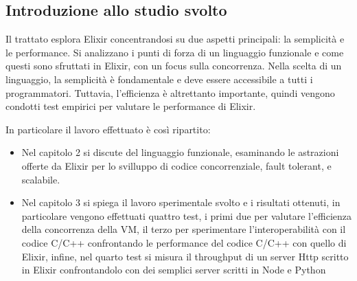 \subsection{Introduzione allo studio svolto}

Il trattato esplora Elixir concentrandosi su due aspetti principali:
la semplicità e le performance. Si analizzano i punti di forza di 
un linguaggio funzionale e come questi sono sfruttati in Elixir, con 
un focus sulla concorrenza. Nella scelta di un linguaggio, la semplicità
è fondamentale e deve essere accessibile a tutti i programmatori.
Tuttavia, l'efficienza è altrettanto importante, quindi vengono condotti
test empirici per valutare le performance di Elixir.

In particolare il lavoro effettuato è così ripartito: 


\begin{itemize}
	\item Nel capitolo 2 si discute del linguaggio funzionale,
	esaminando le astrazioni offerte da Elixir per lo svilluppo
	di codice concorrenziale, fault tolerant, e scalabile.
	\item Nel capitolo 3 si spiega il lavoro sperimentale svolto e i risultati
	ottenuti, in particolare vengono effettuati quattro test, i primi due
	per valutare l'efficienza della concorrenza della VM, il terzo per
	sperimentare l'interoperabilità con il codice C/C++ confrontando le
	performance del codice C/C++ con quello di Elixir, infine, nel quarto test
	si misura il throughput di un server Http scritto in
	Elixir confrontandolo con dei semplici server scritti in Node e Python

\end{itemize}


